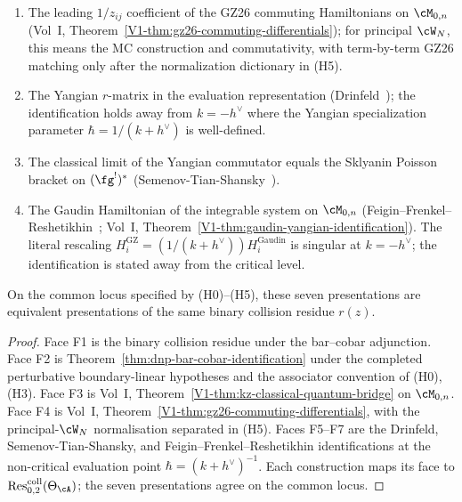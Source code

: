 \begin{theorem}
\begin{enumerate}[label=\textup{(F\arabic*)}]
 \textup{(}Vol~I, Theorem~\textup{\ref{V1-thm:kz-classical-quantum-bridge}}\textup{)},
 over $\cM_{0,n}$.
\item The leading $1/z_{ij}$ coefficient of the GZ26 commuting
 Hamiltonians on $\cM_{0,n}$
 \textup{(}Vol~I, Theorem~\textup{\ref{V1-thm:gz26-commuting-differentials}}\textup{)};
 for principal $\cW_N$, this means the MC construction and
 commutativity, with term-by-term GZ26 matching only after the
 normalization dictionary in \textup{(}H5\textup{)}.
\item The Yangian $r$-matrix in the evaluation representation
 \textup{(}Drinfeld~\cite{Drinfeld85}\textup{)}; the identification
 holds away from $k = -h^\vee$ where the Yangian specialization
 parameter $\hbar = 1/(k + h^\vee)$ is well-defined.
\item The classical limit of the Yangian commutator equals the Sklyanin
 Poisson bracket on $(\fg^!)^*$
 \textup{(}Semenov-Tian-Shansky~\cite{STS83}\textup{)}.
\item The Gaudin Hamiltonian of the integrable system on $\cM_{0,n}$
 \textup{(}Feigin--Frenkel--Reshetikhin~\cite{FFR94};
 Vol~I, Theorem~\textup{\ref{V1-thm:gaudin-yangian-identification}}\textup{)}.
 The literal rescaling $H_i^{\mathrm{GZ}} = (1/(k+h^\vee))
 H_i^{\mathrm{Gaudin}}$ is singular at $k = -h^\vee$; the
 identification is stated away from the critical level.
\end{enumerate}
On the common locus specified by \textup{(H0)--(H5)}, these seven
presentations are equivalent presentations of the same binary collision
residue $r(z)$.
\end{theorem}

\begin{proof}
Face F1 is the binary collision residue under the bar--cobar
adjunction. Face F2 is
Theorem~\ref{thm:dnp-bar-cobar-identification} under the completed
perturbative boundary-linear hypotheses and the associator
convention of (H0), (H3). Face F3 is Vol~I,
Theorem~\ref{V1-thm:kz-classical-quantum-bridge} on $\cM_{0,n}$.
Face F4 is Vol~I,
Theorem~\ref{V1-thm:gz26-commuting-differentials}, with the
principal-$\cW_N$ normalisation separated in (H5). Faces F5--F7
are the Drinfeld, Semenov-Tian-Shansky, and
Feigin--Frenkel--Reshetikhin identifications at the non-critical
evaluation point $\hbar=(k+h^\vee)^{-1}$. Each construction maps
its face to $\operatorname{Res}^{\mathrm{coll}}_{0,2}(\Theta_\cA)$;
the seven presentations agree on the common locus.
\end{proof}

